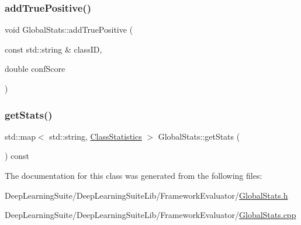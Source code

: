 \subsubsection{\texorpdfstring{add\+True\+Positive()}{addTruePositive()}}
{\footnotesize\ttfamily void Global\+Stats\+::add\+True\+Positive (\begin{DoxyParamCaption}\item[{const std\+::string \&}]{class\+ID,  }\item[{double}]{conf\+Score }\end{DoxyParamCaption})}

\mbox{\label{class_global_stats_a2a98ea3959dc7e104122a7839e6249fe}} 
\subsubsection{\texorpdfstring{get\+Stats()}{getStats()}}
{\footnotesize\ttfamily std\+::map$<$ std\+::string, \hyperlink{struct_class_statistics}{Class\+Statistics} $>$ Global\+Stats\+::get\+Stats (\begin{DoxyParamCaption}{ }\end{DoxyParamCaption}) const}



The documentation for this class was generated from the following files\+:\begin{DoxyCompactItemize}
\item 
Deep\+Learning\+Suite/\+Deep\+Learning\+Suite\+Lib/\+Framework\+Evaluator/\hyperlink{_global_stats_8h}{Global\+Stats.\+h}\item 
Deep\+Learning\+Suite/\+Deep\+Learning\+Suite\+Lib/\+Framework\+Evaluator/\hyperlink{_global_stats_8cpp}{Global\+Stats.\+cpp}\end{DoxyCompactItemize}
